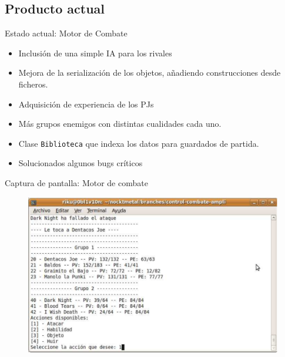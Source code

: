 \documentclass[9pt,xcolor=svgnames]{beamer}
\begin{document}
   \subsection{Producto actual}

   \begin{frame}{Estado actual: Motor de Combate}
   \transdissolve

    \begin{itemize}
     \item Inclusión de una simple IA para los rivales
     \item Mejora de la serialización de los objetos, añadiendo
	   construcciones desde ficheros.
     \item Adquisición de experiencia de los PJs
     \item Más grupos enemigos con distintas cualidades cada uno.
     \item Clase \texttt{Biblioteca} que indexa los datos para 
	   guardados de partida.
     \item Solucionados algunos bugs críticos
    \end{itemize}
   \end{frame}

   \begin{frame}{Captura de pantalla: Motor de combate}
   \transdissolve

   \begin{figure}[t]
    \includegraphics[scale=0.35]{./Imagenes/combate.pdf}
   \end{figure}    
   \end{frame}
\end{document}
